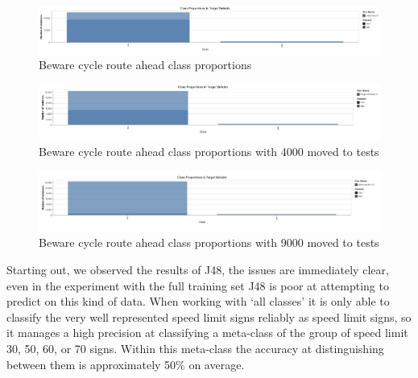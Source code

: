 \documentclass[11pt]{article}
\begin{document}
\begin{figure}[H]
  \caption {Beware cycle route ahead class proportions}\label{fig:turnLeftClassProp}
  \centering 
  \includegraphics[width = \textwidth, height = 0.5\textheight, keepaspectratio]{Images/Sec1Original.png}
\end{figure}

\begin{figure}[H]
  \caption {Beware cycle route ahead class proportions with 4000 moved to tests}\label{fig:turnLeft4k}
  \centering 
  \includegraphics[width = \textwidth, height = 0.5\textheight, keepaspectratio]{Images/Sec1-4k.png}
\end{figure}

\begin{figure}[H]
  \caption {Beware cycle route ahead class proportions with 9000 moved to tests}\label{fig:turnLeft9K}
  \centering 
  \includegraphics[width = \textwidth, height = 0.5\textheight, keepaspectratio]{Images/Sec1-9k.png}
\end{figure}

Starting out, we observed the results of J48, the issues are immediately clear, even in the experiment with the full training set J48 is poor at attempting to predict on this kind of data.
When working with `all classes' it is only able to classify the very well represented speed limit signs reliably as speed limit signs, so it manages a high precision at classifying a meta-class of the group of speed limit 30, 50, 60, or 70 signs.
Within this meta-class the accuracy at distinguishing between them is approximately 50\% on average.
\end{document}
